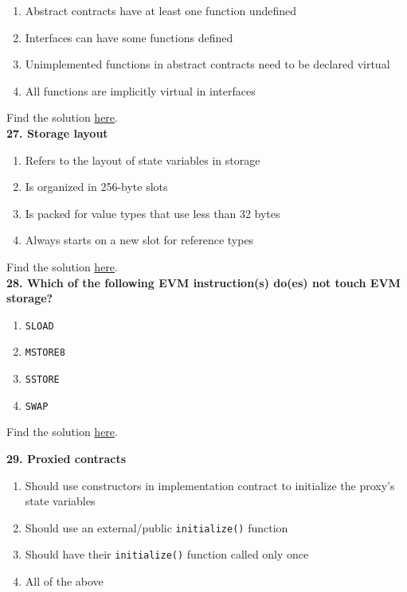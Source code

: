 \begin{enumerate}[label=\Alph*.]
    \item Abstract contracts have at least one function undefined
    \item Interfaces can have some functions defined
    \item Unimplemented functions in abstract contracts need to be declared virtual
    \item All functions are implicitly virtual in interfaces
\end{enumerate}

Find the solution \hyperref[sec:exam3_q26]{here}.\\

\textbf{27. Storage layout}

\begin{enumerate}[label=\Alph*.]
    \item Refers to the layout of state variables in storage
    \item Is organized in 256-byte slots
    \item Is packed for value types that use less than 32 bytes
    \item Always starts on a new slot for reference types
\end{enumerate}

Find the solution \hyperref[sec:exam3_q27]{here}.\\

\textbf{28. Which of the following EVM instruction(s) do(es) not touch EVM storage?}

\begin{enumerate}[label=\Alph*.]
    \item\verb|SLOAD|
    \item\verb|MSTORE8|
    \item\verb|SSTORE|
    \item\verb|SWAP|
\end{enumerate}

Find the solution \hyperref[sec:exam3_q28]{here}.\\

\pagebreak

\textbf{29. Proxied contracts}

\begin{enumerate}[label=\Alph*.]
    \item Should use constructors in implementation contract to initialize the proxy's state variables
    \item Should use an external/public \verb|initialize()| function
    \item Should have their \verb|initialize()| function called only once
    \item All of the above
\end{enumerate}

